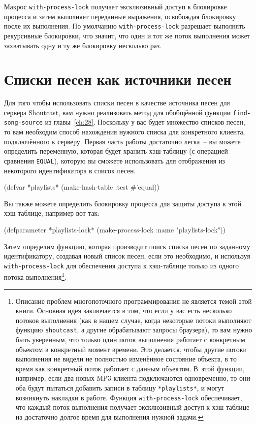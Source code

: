 Макрос \lstinline{with-process-lock} получает эксклюзивный доступ к блокировке процесса и
затем выполняет переданные выражения, освобождая блокировку после их выполнения.  По
умолчанию \lstinline{with-process-lock} разрешает выполнять рекурсивные блокировки, что
значит, что один и тот же поток выполнения может захватывать одну и ту же блокировку
несколько раз.

\section{Списки песен как источники песен}

Для того чтобы использовать списки песен в качестве источника песен для сервера
Shoutcast, вам нужно реализовать метод для обобщённой функции \lstinline{find-song-source} из
главы~\ref{ch:28}.  Поскольку у вас будет множество списков песен, то вам необходим способ
нахождения нужного списка для конкретного клиента, подключённого к серверу.  Первая часть
работы достаточно легка~-- вы можете определить переменную, которая будет хранить
хэш-таблицу (с операцией сравнения \lstinline{EQUAL}), которую вы сможете использовать для
отображения из некоторого идентификатора в список песен.

\begin{myverb}
(defvar *playlists* (make-hash-table :test #'equal))
\end{myverb}

Вы также можете определить блокировку процесса для защиты доступа к этой хэш-таблице,
например вот так:

\begin{myverb}
(defparameter *playlists-lock* (make-process-lock :name "playlists-lock"))
\end{myverb}

Затем определим функцию, которая производит поиск списка песен по заданному
идентификатору, создавая новый список песен, если это необходимо, и используя
\lstinline{with-process-lock} для обеспечения доступа к хэш-таблице только из одного потока
выполнения\footnote{Описание проблем многопоточного программирования не является темой
  этой книги. Основная идея заключается в том, что если у вас есть несколько потоков
  выполнения (как в нашем случае, когда некоторые потоки выполняют функцию
  \lstinline{shoutcast}, а другие обрабатывают запросы браузера), то вам нужно быть уверенным,
  что только один поток выполнения работает с конкретным объектом в конкретный момент
  времени.  Это делается, чтобы другие потоки выполнения не видели не полностью изменённое
  состояние объекта, в то время как конкретный поток работает с данным объектом.  В~этой
  функции, например, если два новых MP3-клиента подключаются одновременно, то они оба
  будут пытаться добавить записи в таблицу \lstinline{*playlists*}, и могут возникнуть накладки
  в работе.  Функция \lstinline{with-process-lock} обеспечивает, что каждый поток выполнения
  получает эксклюзивный доступ к хэш-таблице на достаточно долгое время для выполнения
  нужной задачи.}\hspace{\footnotenegspace}.


